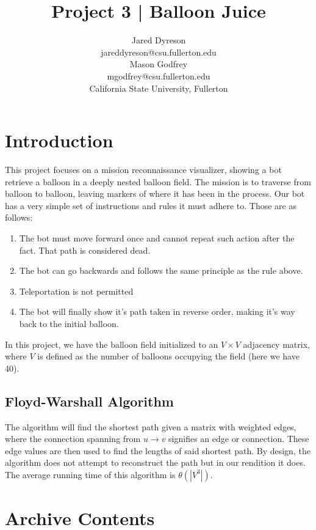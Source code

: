 \documentclass{article}
\title{Project 3 | Balloon Juice}
\author{Jared Dyreson \\
        jareddyreson@csu.fullerton.edu \\
        Mason Godfrey \\
        mgodfrey@csu.fullerton.edu \\
        California State University, Fullerton}
\date
\begin{document}
\maketitle
\tableofcontents

\newpage

\section{Introduction}

This project focuses on a mission reconnaissance visualizer, showing a bot retrieve a balloon in a deeply nested balloon field.
The mission is to traverse from balloon to balloon, leaving markers of where it has been in the process.
Our bot has a very simple set of instructions and rules it must adhere to.
Those are as follows:

\begin{enumerate}
\item The bot must move forward once and cannot repeat such action after the fact. That path is considered dead.
\item The bot can go backwards and follows the same principle as the rule above.
\item Teleportation is not permitted
\item The bot will finally show it's path taken in reverse order, making it's way back to the initial balloon.
\end{enumerate}

\begin{flushleft}
In this project, we have the balloon field initialized to an $V \times V$ adjacency matrix, where $V$ is defined as the number of balloons occupying the field (here we have 40).
\end{flushleft}

\subsection{Floyd-Warshall Algorithm}

The algorithm will find the shortest path given a matrix with weighted edges, where the connection spanning from $u \rightarrow v$ signifies an edge or connection.
These edge values are then used to find the lengths of said shortest path.
By design, the algorithm does not attempt to reconstruct the path but in our rendition it does.
The average running time of this algorithm is $\theta(|V^3|)$.

\newpage

\section{Archive Contents}
\end{document}
